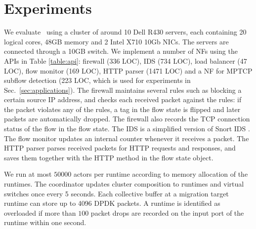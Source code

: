\section{Experiments}
\label{sec:experiments}


We evaluate \nfactor~using a cluster of around 10 Dell R430 servers, each containing 20 logical cores, 48GB memory and 2 Intel X710 10Gb NICs. The servers are connected through a 10GB switch. We implement a number of NFs using the APIs in Table \ref{table:api}: firewall (336 LOC), IDS (734 LOC), load balancer (47 LOC), flow monitor (169 LOC), HTTP parser (1471 LOC) and a NF for MPTCP subflow detection (223 LOC, which is used for experiments in Sec.~\ref{sec:applications}). %
The firewall maintains several rules such as blocking a certain source IP address,
and checks each received packet against the rules: if the packet violates any of the rules, a tag in the flow state is flipped and later packets are automatically dropped. The firewall also records the TCP connection status of the flow in the flow state. The IDS is a simplified version of Snort IDS \cite{snort}.
The flow monitor updates an internal counter whenever it receives a packet. The HTTP parser parses received packets for HTTP requests and responses, and saves them together with the HTTP method in the flow state object. %

We run at most $50000$ actors per runtime according to memory allocation of the runtimes. %
The coordinator updates cluster composition to runtimes and virtual switches once every 5 seconds.
Each collective buffer at a migration target runtime can store up to 4096 DPDK packets.%
A runtime is identified as overloaded if more than $100$ packet drops are recorded on the input port of the runtime within one second.

